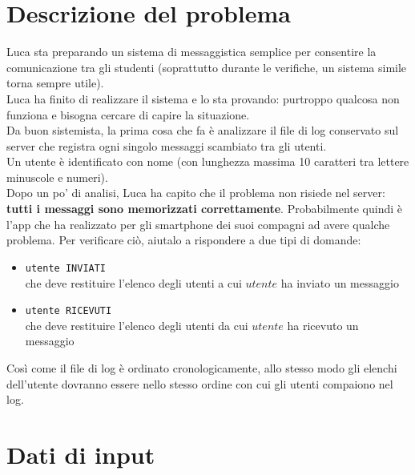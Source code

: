 \documentclass[a4paper,11pt]{article}
\begin{document}
\vspace{0.5cm}



\section*{Descrizione del problema}
    Luca sta preparando un sistema di messaggistica semplice per consentire la comunicazione tra gli studenti (soprattutto durante le verifiche, un sistema simile torna sempre utile). \\
    Luca ha finito di realizzare il sistema e lo sta provando: purtroppo qualcosa non funziona e bisogna cercare di capire la situazione. \\
    Da buon sistemista, la prima cosa che fa è analizzare il file di log conservato sul server che registra ogni singolo messaggi scambiato tra gli utenti. \\
    Un utente è identificato con nome (con lunghezza massima 10 caratteri tra lettere minuscole e numeri). \\
    Dopo un po' di analisi, Luca ha capito che il problema non risiede nel server: \textbf{tutti i messaggi sono memorizzati correttamente}. Probabilmente quindi è l'app che ha realizzato per gli smartphone dei suoi compagni ad avere qualche problema. Per verificare ciò, aiutalo a rispondere a due tipi di domande:
    \begin{itemize}
        \item{\verb|utente INVIATI| \\che deve restituire l'elenco degli utenti a cui $utente$ ha inviato un messaggio}
        \item{\verb|utente RICEVUTI|\\ che deve restituire l'elenco degli utenti da cui $utente$ ha ricevuto un messaggio}
    \end{itemize}
    Così come il file di log è ordinato cronologicamente, allo stesso modo gli elenchi dell'utente dovranno essere nello stesso ordine con cui gli utenti compaiono nel log. 


\section*{Dati di input}
  
\end{document}

